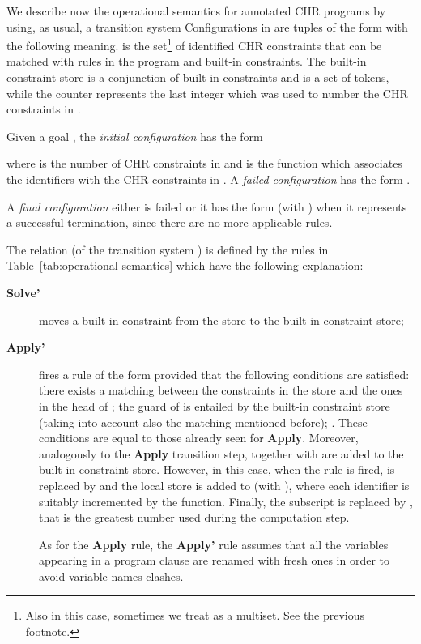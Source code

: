 \documentclass{tlp}
\begin{document}
We describe now the operational semantics   for annotated CHR
programs by using, as usual, a transition system
 Configurations in
 are tuples of the form  with the following meaning.   is the set\footnote{Also in this case, sometimes we treat  as a multiset. See the previous footnote.} of
identified CHR constraints that can be matched with rules in the
program  and built-in constraints. The built-in constraint
store  is a conjunction of built-in constraints and  is a
set of tokens, while the counter  represents the last integer
which was used to number the CHR constraints in .


Given a goal , the  {\em initial configuration} has the form

where  is the number of CHR constraints in  and  is the function which associates the identifiers with the CHR constraints in .
A {\em failed
configuration} has the form .


A {\em final
configuration} either is failed or it has the form  (with ) when it represents a successful
termination, since there are no more applicable rules.

The relation  (of the transition system ) is defined  by the rules in
Table~\ref{tab:operational-semantics} which have the following explanation:
\begin{description}
\item[\textbf{Solve'}]{moves a built-in constraint from the store to the
built-in constraint store;}

\item[\textbf{Apply'}] {fires  a rule  of the form  provided that the following conditions are satisfied: there exists a matching between the constraints in the store and the ones in
the head of ; the guard of  is
entailed by the built-in constraint store (taking into account also the
matching mentioned before); . These conditions are equal to those already seen for {\bf Apply}. Moreover, analogously to the {\bf Apply} transition step,
 together with  are added to the built-in constraint
store.
However, in this case, when the rule  is fired,  is replaced by  and the local store  is added to  (with ), where each identifier
is suitably incremented by the  function.  Finally, the subscript  is replaced by , that is
the greatest number used during the computation step.

As for the \textbf{Apply} rule, the  \textbf{Apply'} rule assumes that all
the variables appearing in a program clause are renamed with fresh ones in order to
avoid variable names clashes.

}
\end{description}
\end{document}
